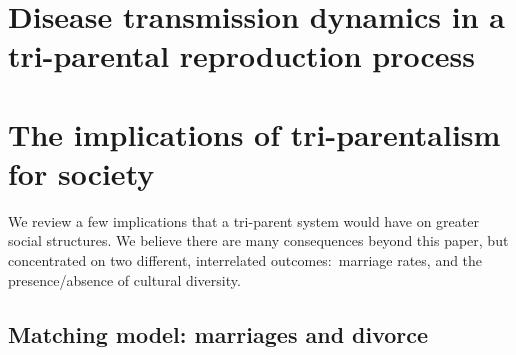 \documentclass{report}
\begin{document}





\section*{Disease transmission dynamics in a tri-parental reproduction process}



\section*{The implications of tri-parentalism for society}

We review a few implications that a tri-parent system would have on greater social structures. We believe there are many consequences beyond this paper, but concentrated on two different, interrelated outcomes:\ marriage rates, and the presence/absence of cultural diversity.

\subsection*{Matching model: marriages and divorce}
\end{document}
